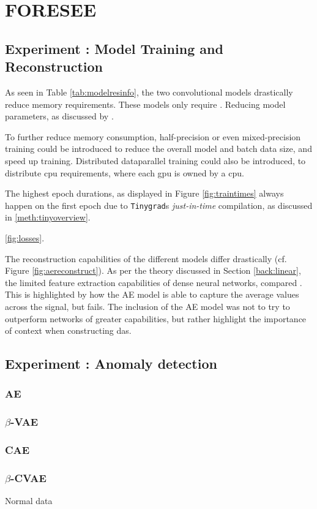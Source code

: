 \section{FORESEE}
\label{disc:foresee}

\subsection{Experiment : Model Training and Reconstruction}

As seen in Table \ref{tab:modelresinfo}, the two convolutional models drastically reduce memory requirements. These models only require . 
Reducing model parameters, as discussed by \cite{s23021009} . 

To further reduce memory consumption, half-precision or even mixed-precision training could be introduced to reduce the overall model and batch data size, and speed up training. Distributed dataparallel training could also be introduced, to distribute \acrshort{cpu} requirements, where each \acrshort{gpu} is owned by a \acrshort{cpu}.

The highest epoch durations, as displayed in Figure \ref{fig:traintimes} always happen on the first epoch due to \texttt{Tinygrad}s \textit{just-in-time} compilation, as discussed in \ref{meth:tinyoverview}. 


\ref{fig:losses}. 
      
The reconstruction capabilities of the different models differ drastically (cf. Figure \ref{fig:aereconstruct}). As per the theory discussed in Section \ref{back:linear}, the limited feature extraction capabilities of dense neural networks, compared  . This is highlighted by how the AE model is able to capture the average values across the signal, but fails. The inclusion of the AE model was not to try to outperform networks of greater capabilities, but rather highlight the importance of  context when constructing \acrshort{das}. 



\subsection{Experiment : Anomaly detection}

\subsubsection{AE}
\subsubsection{$\beta$-VAE}
\subsubsection{CAE}
\subsubsection{$\beta$-CVAE}


Normal data 
